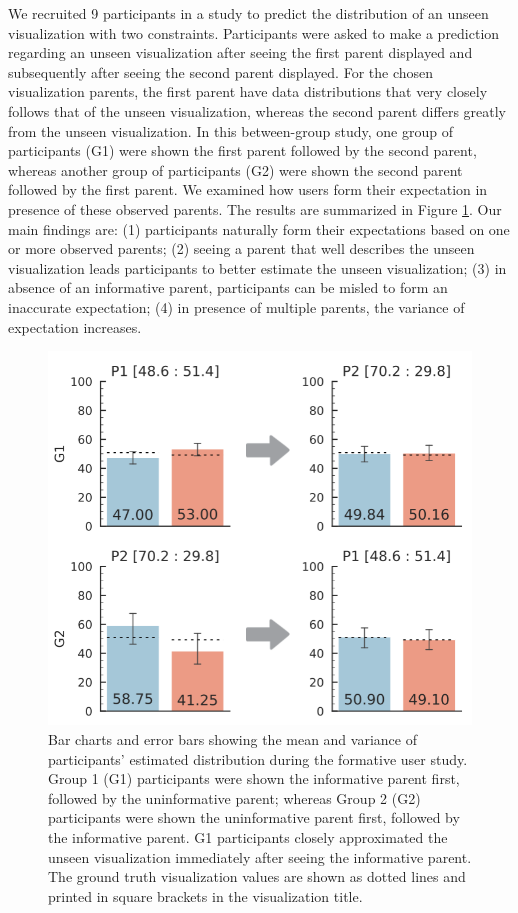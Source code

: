 We recruited 9 participants in a study to predict the distribution of an unseen visualization with two constraints. Participants were asked to make a prediction regarding an unseen visualization after seeing the first parent displayed and subsequently after seeing the second parent displayed. For the chosen visualization parents, the first parent have data distributions that very closely follows that of the unseen visualization, whereas the second parent differs greatly from the unseen visualization. In this between-group study, one group of participants (G1) were shown the first parent followed by the second parent, whereas another group of participants (G2) were shown the second parent followed by the first parent. We examined how users form their expectation in presence of these observed parents. The results are summarized in Figure \ref{fig:formative_study}. Our main findings are: (1) participants naturally form their expectations based on one or more observed parents; (2) seeing a parent that well describes the unseen visualization leads participants to better estimate the unseen visualization; (3) in absence of an informative parent, participants can be misled to form an inaccurate expectation; (4) in presence of multiple parents, the variance of expectation increases.
\begin{figure}[h!]
\centering
\includegraphics[width=\linewidth]{figures/Formative_Study.png}
\caption{Bar charts and error bars showing the mean and variance of participants' estimated distribution during the formative user study. Group 1 (G1) participants were shown the informative parent first, followed by the uninformative parent; whereas Group 2 (G2) participants were shown the uninformative parent first, followed by the informative parent. G1 participants closely approximated the unseen visualization immediately after seeing the informative parent. The ground truth visualization values are shown as dotted lines and printed in square brackets in the visualization title.}
\label{fig:formative_study}
\end{figure}
